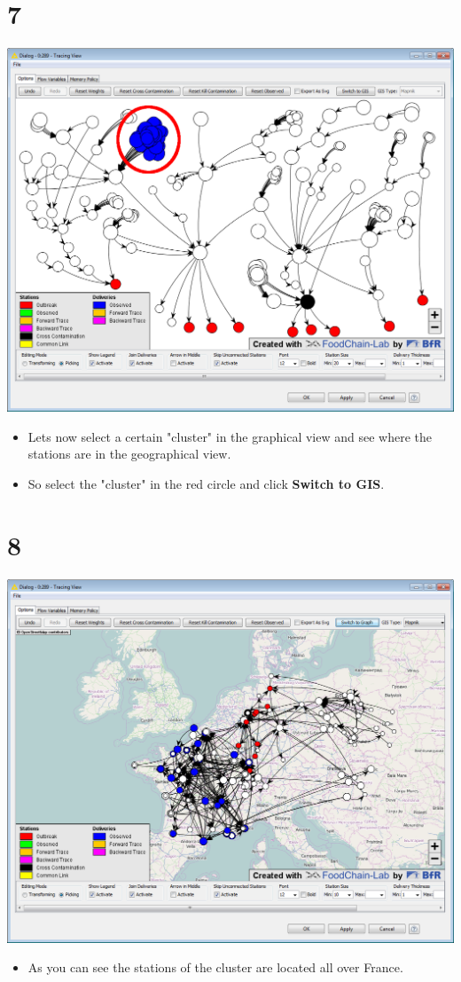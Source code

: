 \documentclass{beamer}
\begin{document}
\section{7}
\begin{frame}
	\begin{center}
  		\includegraphics[height=0.6\textheight]{7.png}
	\end{center}
	\begin{itemize}
		\item Lets now select a certain "cluster" in the graphical view and see where the stations are in the geographical view.
		\item So select the "cluster" in the red circle and click \textbf{Switch to GIS}.
	\end{itemize}
\end{frame}

\section{8}
\begin{frame}
	\begin{center}
  		\includegraphics[height=0.6\textheight]{8.png}
	\end{center}
	\begin{itemize}
		\item As you can see the stations of the cluster are located all over France.
	\end{itemize}
\end{frame}
\end{document}
